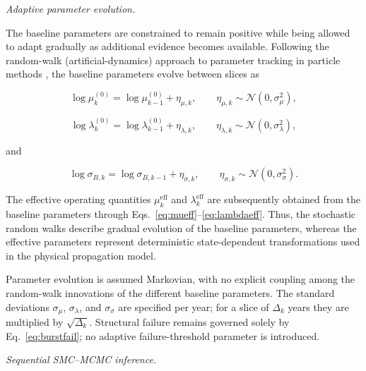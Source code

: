 \documentclass[journal]{IEEEtran}
\begin{document}

\textit{Adaptive parameter evolution.}
\label{sec:transitions}

The baseline parameters are constrained to remain positive while
being allowed to adapt gradually as additional evidence becomes
available. Following the random-walk (artificial-dynamics) approach to
parameter tracking in particle methods \cite{kantas2015}, the baseline
parameters evolve between slices as

\begin{equation}
\log \mu_k^{(0)}
=
\log \mu_{k-1}^{(0)}
+
\eta_{\mu,k},
\qquad
\eta_{\mu,k}\sim
\mathcal{N}(0,\sigma_\mu^2),
\label{eq:muwalk}
\end{equation}

\begin{equation}
\log \lambda_k^{(0)}
=
\log \lambda_{k-1}^{(0)}
+
\eta_{\lambda,k},
\qquad
\eta_{\lambda,k}\sim
\mathcal{N}(0,\sigma_\lambda^2),
\label{eq:lambdawalk}
\end{equation}

and

\begin{equation}
\log \sigma_{B,k}
=
\log \sigma_{B,k-1}
+
\eta_{\sigma,k},
\qquad
\eta_{\sigma,k}\sim
\mathcal{N}(0,\sigma_{\sigma}^2).
\label{eq:sigmaBwalk}
\end{equation}

The effective operating quantities
$\mu_k^{\mathrm{eff}}$ and $\lambda_k^{\mathrm{eff}}$ are subsequently
obtained from the baseline parameters through
Eqs.~\eqref{eq:mueff}--\eqref{eq:lambdaeff}. Thus, the stochastic
random walks describe gradual evolution of the baseline parameters,
whereas the effective parameters represent deterministic
state-dependent transformations used in the physical propagation
model.

Parameter evolution is assumed Markovian, with no explicit coupling
among the random-walk innovations of the different baseline
parameters. The standard deviations $\sigma_\mu$, $\sigma_\lambda$, and
$\sigma_\sigma$ are specified per year; for a slice of $\Delta_k$ years
they are multiplied by $\sqrt{\Delta_k}$. Structural failure remains governed solely by
Eq.~\eqref{eq:burstfail}; no adaptive failure-threshold parameter is
introduced.



\textit{Sequential SMC--MCMC inference.}
\label{sec:smc}
\end{document}

